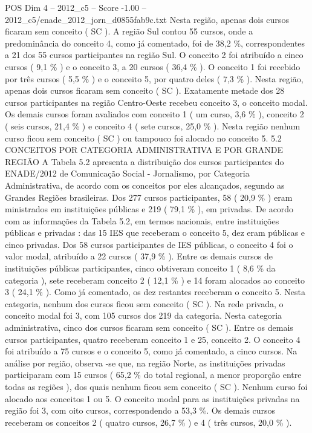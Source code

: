 \begin{textsample}{POS Dim 4 – 2012\_c5 – Score -1.00 – 2012\_c5/enade\_2012\_jorn\_d0855fab9c.txt}
Nesta região, apenas dois cursos ficaram sem conceito ( SC ).
A região Sul contou 55 cursos, onde a predominância do conceito 4, como já comentado, foi de 38,2 \%, correspondentes a 21 dos 55 cursos participantes na região Sul.
O conceito 2 foi atribuído a cinco cursos ( 9,1 \% ) e o conceito 3, a 20 cursos ( 36,4 \% ).
O conceito 1 foi recebido por três cursos ( 5,5 \% ) e o conceito 5, por quatro deles ( 7,3 \% ).
Nesta região, apenas dois cursos ficaram sem conceito ( SC ).
Exatamente metade dos 28 cursos participantes na região Centro-Oeste recebeu conceito 3, o conceito modal.
Os demais cursos foram avaliados com conceito 1 ( um curso, 3,6 \% ), conceito 2 ( seis cursos, 21,4 \% ) e conceito 4 ( sete cursos, 25,0 \% ).
Nesta região nenhum curso ficou sem conceito ( SC ) ou tampouco foi alocado no conceito 5. 5.2 CONCEITOS POR CATEGORIA ADMINISTRATIVA E POR GRANDE REGIÃO A Tabela 5.2 apresenta a distribuição dos cursos participantes do ENADE/2012 de Comunicação Social - Jornalismo, por Categoria Administrativa, de acordo com os conceitos por eles alcançados, segundo as Grandes Regiões brasileiras.
Dos 277 cursos participantes, 58 ( 20,9 \% ) eram ministrados em instituições públicas e 219 ( 79,1 \% ), em privadas.
De acordo com as informações da Tabela 5.2, em termos nacionais, entre instituições públicas e privadas : das 15 IES que receberam o conceito 5, dez eram públicas e cinco privadas.
Dos 58 cursos participantes de IES públicas, o conceito 4 foi o valor modal, atribuído a 22 cursos ( 37,9 \% ).
Entre os demais cursos de instituições públicas participantes, cinco obtiveram conceito 1 ( 8,6 \% da categoria ), sete receberam conceito 2 ( 12,1 \% ) e 14 foram alocados ao conceito 3 ( 24,1 \% ).
Como já comentado, os dez restantes receberam o conceito 5.
Nesta categoria, nenhum dos cursos ficou sem conceito ( SC ).
Na rede privada, o conceito modal foi 3, com 105 cursos dos 219 da categoria.
Nesta categoria administrativa, cinco dos cursos ficaram sem conceito ( SC ).
Entre os demais cursos participantes, quatro receberam conceito 1 e 25, conceito 2.
O conceito 4 foi atribuído a 75 cursos e o conceito 5, como já comentado, a cinco cursos.
Na análise por região, observa -se que, na região Norte, as instituições privadas participaram com 15 cursos ( 65,2 \% do total regional, a menor proporção entre todas as regiões ), dos quais nenhum ficou sem conceito ( SC ).
Nenhum curso foi alocado aos conceitos 1 ou 5.
O conceito modal para as instituições privadas na região foi 3, com oito cursos, correspondendo a 53,3 \%.
Os demais cursos receberam os conceitos 2 ( quatro cursos, 26,7 \% ) e 4 ( três cursos, 20,0 \% ).

\end{textsample}
